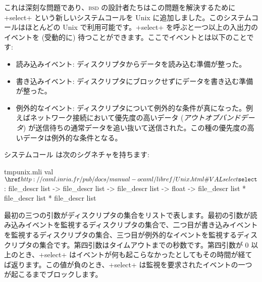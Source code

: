 これは深刻な問題であり、\textsc{bsd} の設計者たちはこの問題を解決するために \ml+select+ という新しいシステムコールを Unix に追加しました。このシステムコールはほとんどの Unix で利用可能です。\ml+select+ を呼ぶと一つ以上の入出力のイベントを (受動的に) 待つことができます。ここでイベントとは以下のことです:
%
\begin{itemize}
\item 読み込みイベント: ディスクリプタからデータを読み込む準備が整った。

\item 書き込みイベント: ディスクリプタにブロックせずにデータを書き込む準備が整った。

\item 例外的なイベント: ディスクリプタについて例外的な条件が真になった。例えばネットワーク接続において優先度の高いデータ (\emph{アウトオブバンドデータ}) が送信待ちの通常データを追い抜いて送信された。この種の優先度の高いデータは例外的な条件となる。
\end{itemize}
%
システムコール  は次のシグネチャを持ちます:
%
\begin{listingcodefile}{tmpunix.mli}
val $\libvalue{Unix}{select}$ :
    file_descr list -> file_descr list -> file_descr list ->
      float -> file_descr list * file_descr list * file_descr list
\end{listingcodefile}
%
最初の三つの引数がディスクリプタの集合をリストで表します。最初の引数が読み込みイベントを監視するディスクリプタの集合で、二つ目が書き込みイベントを監視するディスクリプタの集合、三つ目が例外的なイベントを監視するディスクリプタの集合です。第四引数はタイムアウトまでの秒数です。第四引数が 0 以上のとき、\ml+select+ はイベントが何も起こらなかったとしてもその時間が経てば返ります。この値が負のとき、\ml+select+ は監視を要求されたイベントの一つが起こるまでブロックします。

